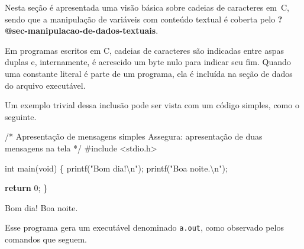 \documentclass[
  letterpaper,
  DIV=11,
  numbers=noendperiod]{scrartcl}
\newenvironment{Shaded}{\begin{snugshade}}{\end{snugshade}}
\newcommand{\CommentTok}[1]{\textcolor[rgb]{0.37,0.37,0.37}{#1}}
\newcommand{\ControlFlowTok}[1]{\textcolor[rgb]{0.00,0.23,0.31}{\textbf{#1}}}
\newcommand{\DataTypeTok}[1]{\textcolor[rgb]{0.68,0.00,0.00}{#1}}
\newcommand{\DecValTok}[1]{\textcolor[rgb]{0.68,0.00,0.00}{#1}}
\newcommand{\ImportTok}[1]{\textcolor[rgb]{0.00,0.46,0.62}{#1}}
\newcommand{\NormalTok}[1]{\textcolor[rgb]{0.00,0.23,0.31}{#1}}
\newcommand{\OperatorTok}[1]{\textcolor[rgb]{0.37,0.37,0.37}{#1}}
\newcommand{\PreprocessorTok}[1]{\textcolor[rgb]{0.68,0.00,0.00}{#1}}
\newcommand{\SpecialCharTok}[1]{\textcolor[rgb]{0.37,0.37,0.37}{#1}}
\newcommand{\StringTok}[1]{\textcolor[rgb]{0.13,0.47,0.30}{#1}}
\begin{document}
Nesta seção é apresentada uma visão básica sobre cadeias de caracteres
em~C, sendo que a manipulação de variáveis com conteúdo textual é
coberta pelo \textbf{?@sec-manipulacao-de-dados-textuais}.

Em programas escritos em C, cadeias de caracteres são indicadas entre
aspas duplas e, internamente, é acrescido um byte nulo para indicar seu
fim. Quando uma constante literal é parte de um programa, ela é incluída
na seção de dados do arquivo executável.

Um exemplo trivial dessa inclusão pode ser vista com um código simples,
como o seguinte.

\begin{Shaded}
\begin{Highlighting}[]
\CommentTok{/*}
\CommentTok{Apresentação de mensagens simples}
\CommentTok{Assegura: apresentação de duas mensagens na tela}
\CommentTok{*/}
\PreprocessorTok{\#include }\ImportTok{\textless{}stdio.h\textgreater{}}

\DataTypeTok{int}\NormalTok{ main}\OperatorTok{(}\DataTypeTok{void}\OperatorTok{)} \OperatorTok{\{}
\NormalTok{    printf}\OperatorTok{(}\StringTok{"Bom dia!}\SpecialCharTok{\textbackslash{}n}\StringTok{"}\OperatorTok{);}
\NormalTok{    printf}\OperatorTok{(}\StringTok{"Boa noite.}\SpecialCharTok{\textbackslash{}n}\StringTok{"}\OperatorTok{);}

    \ControlFlowTok{return} \DecValTok{0}\OperatorTok{;}
\OperatorTok{\}}
\end{Highlighting}
\end{Shaded}

\begin{Shaded}
\begin{Highlighting}[]
\NormalTok{Bom dia!}
\NormalTok{Boa noite.}
\end{Highlighting}
\end{Shaded}

Esse programa gera um executável denominado \texttt{a.out}, como
observado pelos comandos que seguem.

\begin{Shaded}
\end{Shaded}
\end{document}
